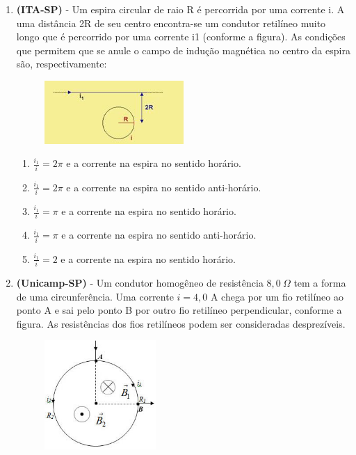 \documentclass[12pt,letterpaper,fleqn]{article}
\begin{document}
\begin{itemize}
\begin{enumerate}
             \item \textbf{(ITA-SP)} - Um espira circular de raio R é percorrida por uma corrente i. A uma distância 2R de seu centro encontra-se um condutor retilíneo muito longo que é percorrido por uma corrente i1 (conforme a figura). As condições que permitem que se anule o campo de indução magnética no centro da espira são, respectivamente: 
             
             \begin{figure}[h]
                 \centering
                 \includegraphics[width=0.5\textwidth]{ex_6.jpg}
             \end{figure}
             
             \begin{enumerate}
                 \item $\frac{i_1}{i} = 2\pi$ e a corrente na espira no sentido horário.  
                 \item $\frac{i_1}{i} = 2\pi$ e a corrente na espira no sentido anti-horário.
                 \item $\frac{i_1}{i} = \pi$ e a corrente na espira no sentido horário.
                 \item $\frac{i_1}{i} = \pi$ e a corrente na espira no sentido anti-horário.
                 \item $\frac{i_1}{i} = 2$ e a corrente na espira no sentido horário.
             \end{enumerate}
             \pagebreak
             \item \textbf{(Unicamp-SP)} - Um condutor homogêneo de resistência $8,0 \:\Omega$ tem a forma de uma circunferência. Uma corrente $i = 4,0$ A chega por um fio retilíneo ao ponto A e sai pelo ponto B por outro fio retilíneo perpendicular, conforme a figura. As resistências dos fios retilíneos podem ser consideradas desprezíveis.
             
             \begin{figure}[h]
                 \centering
                 \includegraphics[width=0.4\textwidth]{ex_7.jpg}
             \end{figure} 
             

\end{enumerate}
\end{itemize}
\end{document}
